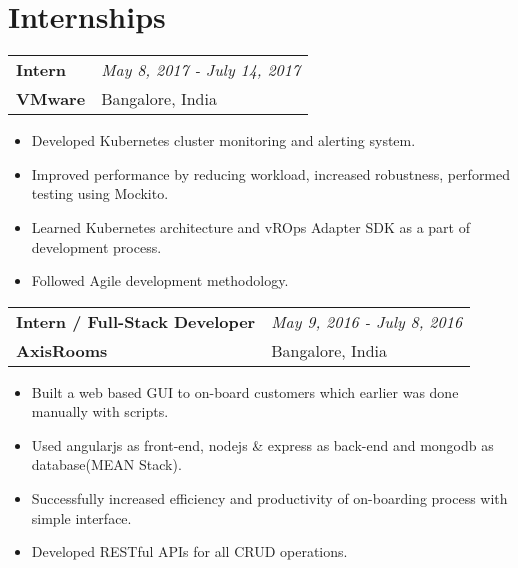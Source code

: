 \documentclass{article}
\begin{document}
\section{Internships}
\begin{tabularx}{\textwidth}{Xl}
    \textbf{Intern} & \textit{May 8, 2017 - July 14, 2017} \\
    \textbf{VMware} & Bangalore, India
\end{tabularx}
\begin{flushleft}
\begin{itemize}
    \item Developed Kubernetes cluster monitoring and alerting system.
    \item Improved performance by reducing workload, increased robustness, performed testing using Mockito.
    \item Learned Kubernetes architecture and vROps Adapter SDK as a part of development process.
    \item Followed Agile development methodology.
\end{itemize}
\end{flushleft}
\begin{tabularx}{\textwidth}{Xl}
    \textbf{Intern / Full-Stack Developer} & \textit{May 9, 2016 - July 8, 2016} \\
    \textbf{AxisRooms} & Bangalore, India
\end{tabularx}
\begin{flushleft}
\begin{itemize}
    \item Built a web based GUI to on-board customers which earlier was done manually with scripts. 
    \item Used angularjs as front-end, nodejs \& express as back-end and mongodb as database(MEAN Stack).
    \item Successfully increased efficiency and productivity of on-boarding process with simple interface. 
    \item Developed RESTful APIs for all CRUD operations.
\end{itemize}
\end{flushleft}
\end{document}
